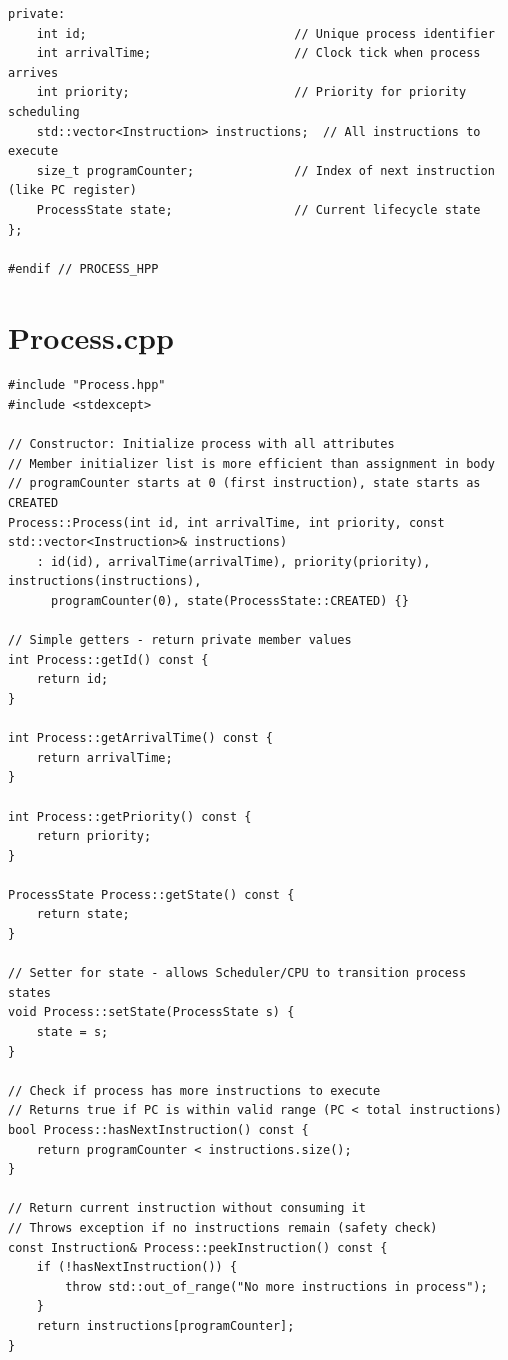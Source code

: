 \documentclass[a4paper,10pt,oneside]{article}
\begin{document}
\begin{multicols*}{\COLS}
\begin{lstlisting}
private:
    int id;                             // Unique process identifier
    int arrivalTime;                    // Clock tick when process arrives
    int priority;                       // Priority for priority scheduling
    std::vector<Instruction> instructions;  // All instructions to execute
    size_t programCounter;              // Index of next instruction (like PC register)
    ProcessState state;                 // Current lifecycle state
};

#endif // PROCESS_HPP
\end{lstlisting}

\section*{Process.cpp}
\begin{lstlisting}
#include "Process.hpp"
#include <stdexcept>

// Constructor: Initialize process with all attributes
// Member initializer list is more efficient than assignment in body
// programCounter starts at 0 (first instruction), state starts as CREATED
Process::Process(int id, int arrivalTime, int priority, const std::vector<Instruction>& instructions)
    : id(id), arrivalTime(arrivalTime), priority(priority), instructions(instructions), 
      programCounter(0), state(ProcessState::CREATED) {}

// Simple getters - return private member values
int Process::getId() const {
    return id;
}

int Process::getArrivalTime() const {
    return arrivalTime;
}

int Process::getPriority() const {
    return priority;
}

ProcessState Process::getState() const {
    return state;
}

// Setter for state - allows Scheduler/CPU to transition process states
void Process::setState(ProcessState s) {
    state = s;
}

// Check if process has more instructions to execute
// Returns true if PC is within valid range (PC < total instructions)
bool Process::hasNextInstruction() const {
    return programCounter < instructions.size();
}

// Return current instruction without consuming it
// Throws exception if no instructions remain (safety check)
const Instruction& Process::peekInstruction() const {
    if (!hasNextInstruction()) {
        throw std::out_of_range("No more instructions in process");
    }
    return instructions[programCounter];
}


\end{lstlisting}
\end{multicols*}
\end{document}
